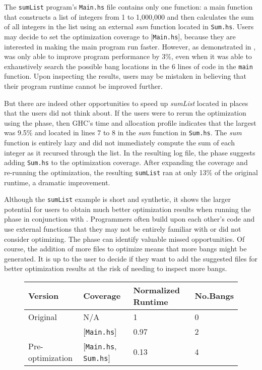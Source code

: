 The \texttt{sumList} program's \texttt{Main.hs} file contains only one
function: a main function that constructs a list of integers from 1 to
1,000,000 and then calculates the sum of all integers in the list using an
external \textit{sum} function located in \texttt{Sum.hs}. Users
may decide to set the optimization coverage to [\texttt{Main.hs}],
because they are interested in making the main program run
faster. However, as demonstrated in , \Ao{} was only able to
improve program performance by 3\%, even when it was able to
exhaustively search the possible bang locations in the 6 lines of code in the \texttt{main}
function. Upon inspecting the results, users may be mistaken in
believing that their program runtime cannot be improved
further.

But there are indeed other opportunities to speed up \textit{sumList}
located in places that the users did not think about. If the users were
to rerun the optimization using the \preopt{} phase, then GHC's time and
allocation profile indicates that the largest \hotspotcost{} was 9.5\%
and located in lines 7 to 8 in the \textit{sum} function
in \texttt{Sum.hs}. The \textit{sum} function is entirely lazy and did
not immediately compute the sum of each integer as it recursed through
the list. In the resulting log file, the \preopt{} phase
suggests
adding \texttt{Sum.hs} to the optimization coverage.
After expanding the coverage and re-running the optimization,
the resulting \texttt{sumList} ran at only 13\% of the original
runtime, a dramatic improvement.

Although the \texttt{sumList} example is short and synthetic, it shows
the larger potential for users to obtain much better optimization
results when running the \preopt{} phase in conjunction
with \Ao{}. Programmers often build upon each other's code and use
external functions that they may not be entirely familiar with or did
not consider optimizing. The \preopt{} phase can identify valuable
missed opportunities. Of
course, the addition of more files to optimize means that more bangs
might be generated. It is up to the user to decide if they want to add
the suggested files for better optimization results at the risk of
needing to inspect more bangs.
\newline

\begin{figure}
\centering
\begin{tabular}{p{3cm}p{4cm}p{3.5cm}p{1cm}}
\hline
Version   & Coverage & Normalized Runtime & No.Bangs \\
\hline
Original      & N/A   &   1  & 0   \\
\Ao{}       & [\texttt{Main.hs}]      & 0.97    &  2\\
Pre-optimization    & [\texttt{Main.hs}, \texttt{Sum.hs}]         & 0.13      & 4\\
\hline
\end{tabular}
\label{fig:sumList}
\end{figure}

